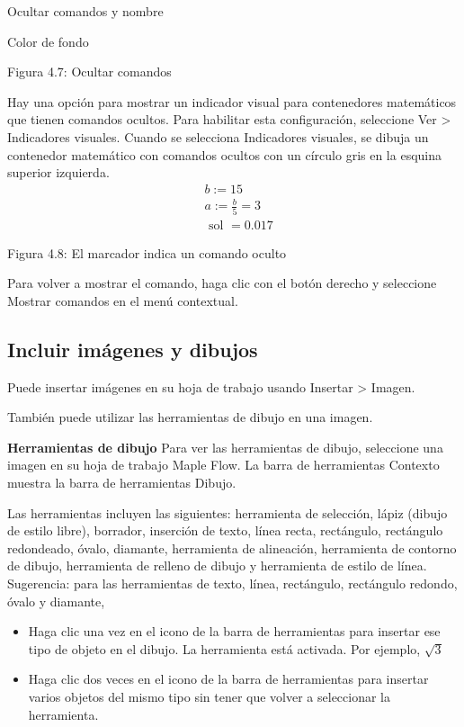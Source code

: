 Ocultar comandos y nombre

Color de fondo

Figura 4.7: Ocultar comandos

Hay una opción para mostrar un indicador visual para contenedores matemáticos que tienen comandos ocultos. Para habilitar esta configuración, seleccione Ver > Indicadores visuales. Cuando se selecciona Indicadores visuales, se dibuja un contenedor matemático con comandos ocultos con un círculo gris en la esquina superior izquierda.
\begin{equation*}
\begin{aligned}
& b:=15 \\
& a:=\frac{b}{5}=3 \\
& \text { sol }=0.017
\end{aligned}
\end{equation*}

Figura 4.8: El marcador indica un comando oculto

Para volver a mostrar el comando, haga clic con el botón derecho y seleccione Mostrar comandos en el menú contextual.

\subsection{Incluir imágenes y dibujos}
Puede insertar imágenes en su hoja de trabajo usando Insertar > Imagen.

También puede utilizar las herramientas de dibujo en una imagen.

\textbf{Herramientas de dibujo}
Para ver las herramientas de dibujo, seleccione una imagen en su hoja de trabajo Maple Flow. La barra de herramientas Contexto muestra la barra de herramientas Dibujo.


Las herramientas incluyen las siguientes: herramienta de selección, lápiz (dibujo de estilo libre), borrador, inserción de texto, línea recta, rectángulo, rectángulo redondeado, óvalo, diamante, herramienta de alineación, herramienta de contorno de dibujo, herramienta de relleno de dibujo y herramienta de estilo de línea. Sugerencia: para las herramientas de texto, línea, rectángulo, rectángulo redondo, óvalo y diamante,

\begin{itemize}
  \item Haga clic una vez en el icono de la barra de herramientas para insertar ese tipo de objeto en el dibujo. La herramienta está activada. Por ejemplo, $\sqrt{3}$

\item Haga clic dos veces en el icono de la barra de herramientas para insertar varios objetos del mismo tipo sin tener que volver a seleccionar la herramienta.
\end{itemize}


